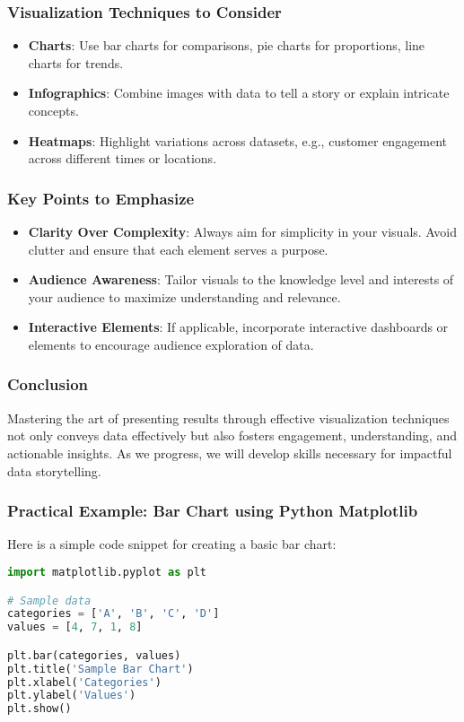 \documentclass[aspectratio=169]{beamer}
\begin{document}
\begin{frame}[fragile]
    \frametitle{Visualization Techniques to Consider}
    \begin{itemize}
        \item \textbf{Charts}: Use bar charts for comparisons, pie charts for proportions, line charts for trends.
        \item \textbf{Infographics}: Combine images with data to tell a story or explain intricate concepts.
        \item \textbf{Heatmaps}: Highlight variations across datasets, e.g., customer engagement across different times or locations.
    \end{itemize}
\end{frame}

\begin{frame}
    \frametitle{Key Points to Emphasize}
    \begin{itemize}
        \item \textbf{Clarity Over Complexity}: Always aim for simplicity in your visuals. Avoid clutter and ensure that each element serves a purpose.
        \item \textbf{Audience Awareness}: Tailor visuals to the knowledge level and interests of your audience to maximize understanding and relevance.
        \item \textbf{Interactive Elements}: If applicable, incorporate interactive dashboards or elements to encourage audience exploration of data.
    \end{itemize}
\end{frame}

\begin{frame}
    \frametitle{Conclusion}
    Mastering the art of presenting results through effective visualization techniques not only conveys data effectively but also fosters engagement, understanding, and actionable insights. 
    As we progress, we will develop skills necessary for impactful data storytelling.
\end{frame}

\begin{frame}[fragile]
    \frametitle{Practical Example: Bar Chart using Python Matplotlib}
    Here is a simple code snippet for creating a basic bar chart:

    \begin{lstlisting}[language=Python]
import matplotlib.pyplot as plt

# Sample data
categories = ['A', 'B', 'C', 'D']
values = [4, 7, 1, 8]

plt.bar(categories, values)
plt.title('Sample Bar Chart')
plt.xlabel('Categories')
plt.ylabel('Values')
plt.show()
    \end{lstlisting}
\end{frame}
\end{document}
